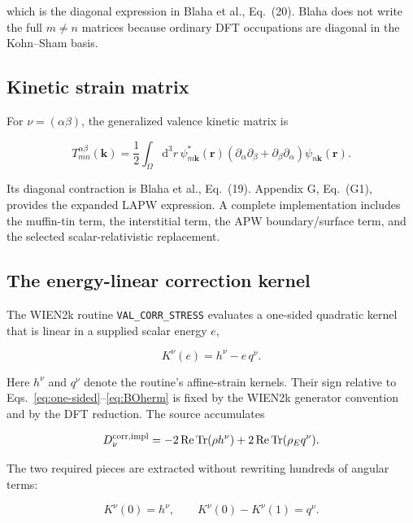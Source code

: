 \documentclass[11pt]{article}
\numberwithin{equation}{section}
\newcommand{\Tr}{\operatorname{Tr}}
\newcommand{\Ree}{\operatorname{Re}}
\newcommand{\dd}{\mathrm d}
\newcommand{\kb}{\mathbf k}
\newcommand{\code}[1]{\texttt{#1}}
\begin{document}
which is the diagonal expression in Blaha et al., Eq.~(20).  Blaha does not
write the full $m\ne n$ matrices because ordinary DFT occupations are diagonal
in the Kohn--Sham basis.

\subsection{Kinetic strain matrix}

For $\nu=(\alpha\beta)$, the generalized valence kinetic matrix is

\begin{equation}
 T^{\alpha\beta}_{mn}(\kb)
 =\frac12\int_\Omega\dd^3r\,
 \psi_{m\kb}^*(\mathbf r)
 (\partial_\alpha\partial_\beta+
  \partial_\beta\partial_\alpha)
 \psi_{n\kb}(\mathbf r).
 \label{eq:Tmn}
\end{equation}

Its diagonal contraction is Blaha et al., Eq.~(19).  Appendix G, Eq.~(G1),
provides the expanded LAPW expression.  A complete implementation includes
the muffin-tin term, the interstitial term, the APW boundary/surface term, and
the selected scalar-relativistic replacement.

\subsection{The energy-linear correction kernel}

The WIEN2k routine \code{VAL\_CORR\_STRESS} evaluates a one-sided quadratic
kernel that is linear in a supplied scalar energy $e$,

\begin{equation}
 K^\nu(e)=h^\nu-e\,q^\nu.
 \label{eq:Klinear}
\end{equation}

Here $h^\nu$ and $q^\nu$ denote the routine's affine-strain kernels.  Their
sign relative to Eqs.~\eqref{eq:one-sided}--\eqref{eq:BOherm} is fixed by the
WIEN2k generator convention and by the DFT reduction.  The source accumulates

\begin{equation}
 D_\nu^{\rm corr,impl}
 =-2\Ree\Tr(\rho h^\nu)
 +2\Ree\Tr(\rho_E q^\nu).
 \label{eq:implcorr}
\end{equation}

The two required pieces are extracted without rewriting hundreds of angular
terms:

\begin{equation}
 K^\nu(0)=h^\nu,
 \qquad K^\nu(0)-K^\nu(1)=q^\nu.
 \label{eq:Ksplit}
\end{equation}
\end{document}

